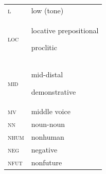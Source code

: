 \documentclass[output=paper]{langsci/langscibook}
\begin{document}
\begin{tabularx}{.45\textwidth}{lX}
\textsc{l}  &  low (tone) \\

\textsc{loc}   &  locative prepositional

proclitic \\

\textsc{mid}  &  mid-distal

demonstrative \\

\textsc{mv}  &   middle voice \\

\textsc{nn}  &  noun-noun \\

\textsc{nhum}  &  nonhuman \\

\textsc{neg}  &   negative \\

\textsc{nfut}  &  nonfuture \\
\end{tabularx}
\end{document}
